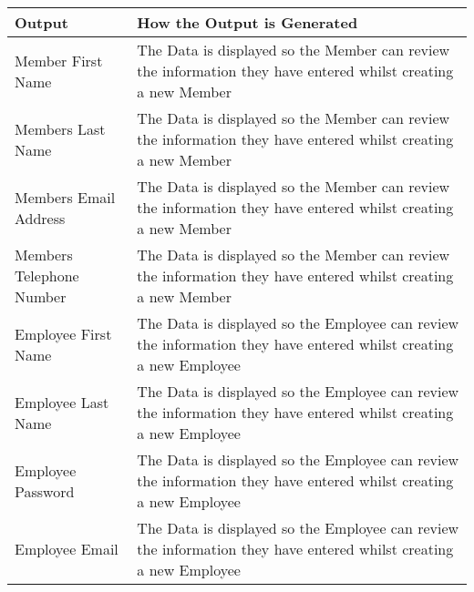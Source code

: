   \begin{tabular}{|p{4cm}|p{4cm}|}
        \hline
	\textbf{Output} & \textbf{ How the Output is Generated}\\ \hline
	{Member First Name} & {The Data is displayed so the Member can review the information they have entered whilst creating a new Member}\\ \hline
	{Members Last Name} & {The Data is displayed so the Member can review the information they have entered whilst creating a new Member}\\ \hline
	{Members Email Address} & {The Data is displayed so the Member can review the information they have entered whilst creating a new Member}\\ \hline
	{Members Telephone Number} & {The Data is displayed so the Member can review the information they have entered whilst creating a new Member}\\ \hline
	{Employee First Name} & {The Data is displayed so the Employee can review the information they have entered whilst creating a new Employee}\\ \hline
	{Employee Last Name} & {The Data is displayed so the Employee can review the information they have entered whilst creating a new Employee}\\ \hline
	{Employee Password} & {The Data is displayed so the Employee can review the information they have entered whilst creating a new Employee}\\ \hline
	{Employee Email} & {The Data is displayed so the Employee can review the information they have entered whilst creating a new Employee}\\ \hline
	\end{tabular}
	
